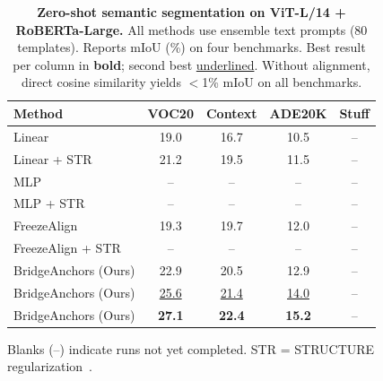 %

\begin{table}[t]
\centering
\caption{%
    \textbf{Zero-shot semantic segmentation on ViT-L/14 + RoBERTa-Large.}
    All methods use ensemble text prompts (80 templates).
    Reports mIoU (\%) on four benchmarks.
    Best result per column in \textbf{bold}; second best \underline{underlined}.
    Without alignment, direct cosine similarity yields $<$1\% mIoU on all benchmarks.
}
\label{tab:segmentation}
\vspace{4pt}
\begin{tabular}{l cccc}
\toprule
\textbf{Method} & VOC20 & Context & ADE20K & Stuff \\
\midrule
Linear
& 19.0 & 16.7 & 10.5 & -- \\
Linear + STR
& 21.2 & 19.5 & 11.5 & -- \\
MLP
& -- & -- & -- & -- \\
MLP + STR
& -- & -- & -- & -- \\
FreezeAlign
& 19.3 & 19.7 & 12.0 & -- \\
FreezeAlign + STR
& -- & -- & -- & -- \\
\midrule
BridgeAnchors (Ours)
& 22.9 & 20.5 & 12.9 & -- \\
BridgeAnchors (Ours)
& \underline{25.6} & \underline{21.4} & \underline{14.0} & -- \\
BridgeAnchors (Ours)
& \textbf{27.1} & \textbf{22.4} & \textbf{15.2} & -- \\
\bottomrule
\end{tabular}
\vspace{-4pt}
\begin{flushleft}
\footnotesize
Blanks (--) indicate runs not yet completed. STR = STRUCTURE regularization~\citep{xxx}.
\end{flushleft}
\end{table}
